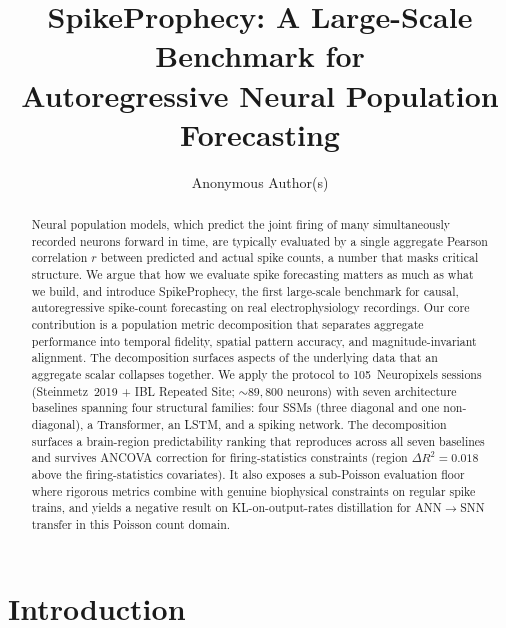 \documentclass{article}
\title{SpikeProphecy: A Large-Scale Benchmark for\\Autoregressive Neural Population Forecasting}
\author{Anonymous Author(s)}
\begin{document}
\maketitle

\begin{abstract}
Neural population models, which predict the joint firing of many
simultaneously recorded neurons forward in time, are typically
evaluated by a single aggregate Pearson correlation $r$ between
predicted and actual spike counts, a number that masks critical
structure.  We argue that how we evaluate spike forecasting matters
as much as what we build, and introduce SpikeProphecy, the first
large-scale benchmark for causal, autoregressive spike-count
forecasting on real electrophysiology recordings.  Our core contribution is a population metric
decomposition that separates aggregate performance into temporal
fidelity, spatial pattern accuracy, and magnitude-invariant
alignment.  The decomposition surfaces aspects of the underlying
data that an aggregate scalar collapses together.  We
apply the protocol to 105~Neuropixels sessions (Steinmetz~2019 +
IBL Repeated Site; ${\sim}89{,}800$ neurons) with seven architecture
baselines spanning four structural families: four SSMs (three diagonal
and one non-diagonal), a Transformer, an LSTM, and a spiking network.
The decomposition surfaces a brain-region predictability ranking that
reproduces across all seven baselines and survives ANCOVA correction
for firing-statistics constraints (region $\Delta R^{2}{=}0.018$
above the firing-statistics covariates).  It also exposes a
sub-Poisson evaluation floor where rigorous metrics combine with
genuine biophysical constraints on regular spike trains, and yields a
negative result on KL-on-output-rates distillation for ANN$\to$SNN
transfer in this Poisson count domain.
\end{abstract}

\section{Introduction}
\label{sec:intro}
\end{document}
